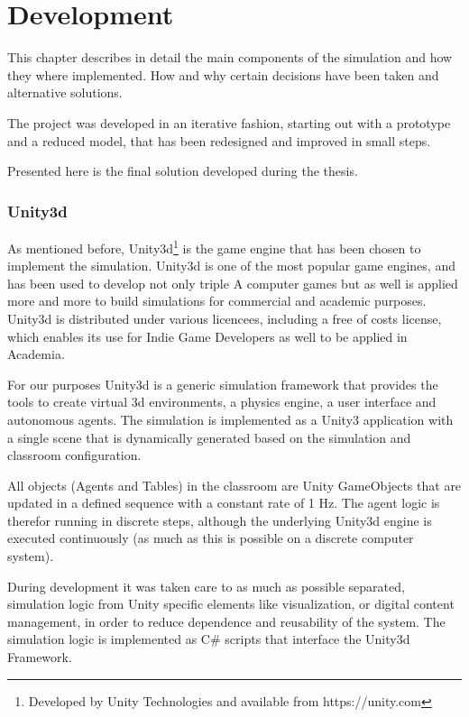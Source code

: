 \chapter{Development}
This chapter describes in detail the main components of the simulation and how
they where implemented. How and why certain decisions have been taken and alternative
solutions.

The project was developed in an iterative fashion, starting out with a
prototype and a reduced model, that has been redesigned and improved in small steps.

Presented here is the final solution developed during the thesis.

\subsection{Unity3d}
As mentioned before, Unity3d\footnote{Developed by Unity Technologies and available from https://unity.com}
is the game engine that has been chosen to implement the simulation. Unity3d is one
of the most popular game engines, and has been used to develop not only triple A
computer games but as well is applied more and more to build simulations for commercial and academic purposes.
Unity3d is distributed under various licencees, including a free of costs license, which
enables its use for Indie Game Developers as well to be applied in Academia.

\bb

For our purposes Unity3d is a generic simulation framework that provides the tools
to create virtual 3d environments, a physics engine, a user interface and autonomous
agents. The simulation is implemented as a Unity3 application with a single scene
that is dynamically generated based on the simulation and classroom configuration.

All objects (Agents and Tables) in the classroom are Unity GameObjects that are
updated in a defined sequence with a constant rate of 1 Hz. The agent logic is therefor
running in discrete steps, although the underlying Unity3d engine is executed
continuously (as much as this is possible on a discrete computer system).

During development it was taken care to as much as possible separated, simulation logic
from Unity specific elements like visualization, or digital content management,
in order to reduce dependence and reusability of the system. The simulation logic
is implemented as C\# scripts that interface the Unity3d Framework.

